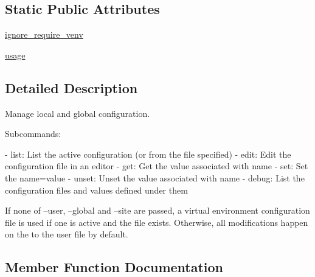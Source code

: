 \subsection*{Static Public Attributes}
\begin{DoxyCompactItemize}
\item 
\hyperlink{classpip_1_1__internal_1_1commands_1_1configuration_1_1ConfigurationCommand_a9cf37ce49ffe2b81261072155c21ee89}{ignore\+\_\+require\+\_\+venv}
\item 
\hyperlink{classpip_1_1__internal_1_1commands_1_1configuration_1_1ConfigurationCommand_aa5a3d8b14f6c268e04e67473d7f48ff4}{usage}
\end{DoxyCompactItemize}


\subsection{Detailed Description}
\begin{DoxyVerb}Manage local and global configuration.

Subcommands:

- list: List the active configuration (or from the file specified)
- edit: Edit the configuration file in an editor
- get: Get the value associated with name
- set: Set the name=value
- unset: Unset the value associated with name
- debug: List the configuration files and values defined under them

If none of --user, --global and --site are passed, a virtual
environment configuration file is used if one is active and the file
exists. Otherwise, all modifications happen on the to the user file by
default.
\end{DoxyVerb}
 

\subsection{Member Function Documentation}
\mbox{\label{classpip_1_1__internal_1_1commands_1_1configuration_1_1ConfigurationCommand_aa2ad2f7172e2f034506eafcea3e9914c}} 
